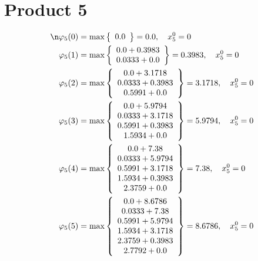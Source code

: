 \documentclass{article}
\begin{document}
\section{Product 5}
\begin{align*}
\n  
  
\varphi_{5}(0) &= \max \left\{ \begin{array}{c}
0.0
\end{array} \right\}=0.0,\quad x_{5}^0=0\\
  
  
  
  
\varphi_{5}(1) &= \max \left\{ \begin{array}{c}
0.0 + 0.3983 \\
 0.0333 + 0.0
\end{array} \right\}=0.3983,\quad x_{5}^0=0\\
  
  
  
  
\varphi_{5}(2) &= \max \left\{ \begin{array}{c}
0.0 + 3.1718 \\
 0.0333 + 0.3983 \\
 0.5991 + 0.0
\end{array} \right\}=3.1718,\quad x_{5}^0=0\\
  
  
  
  
\varphi_{5}(3) &= \max \left\{ \begin{array}{c}
0.0 + 5.9794 \\
 0.0333 + 3.1718 \\
 0.5991 + 0.3983 \\
 1.5934 + 0.0
\end{array} \right\}=5.9794,\quad x_{5}^0=0\\
  
  
  
  
\varphi_{5}(4) &= \max \left\{ \begin{array}{c}
0.0 + 7.38 \\
 0.0333 + 5.9794 \\
 0.5991 + 3.1718 \\
 1.5934 + 0.3983 \\
 2.3759 + 0.0
\end{array} \right\}=7.38,\quad x_{5}^0=0\\
  
  
  
  
\varphi_{5}(5) &= \max \left\{ \begin{array}{c}
0.0 + 8.6786 \\
 0.0333 + 7.38 \\
 0.5991 + 5.9794 \\
 1.5934 + 3.1718 \\
 2.3759 + 0.3983 \\
 2.7792 + 0.0
\end{array} \right\}=8.6786,\quad x_{5}^0=0\\
  

\end{align*}
\end{document}
